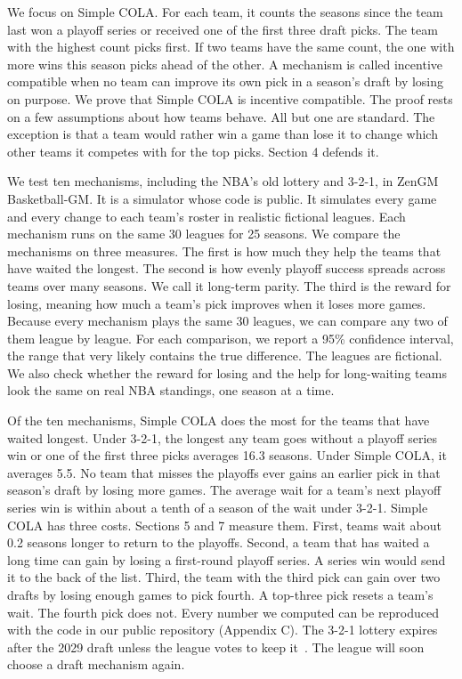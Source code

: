\documentclass[11pt,letterpaper]{article}
\begin{document}
We focus on Simple COLA. For each team, it counts the seasons since the team last won a playoff series or received one of the first three draft picks. The team with the highest count picks first. If two teams have the same count, the one with more wins this season picks ahead of the other. A mechanism is called incentive compatible when no team can improve its own pick in a season's draft by losing on purpose. We prove that Simple COLA is incentive compatible. The proof rests on a few assumptions about how teams behave. All but one are standard. The exception is that a team would rather win a game than lose it to change which other teams it competes with for the top picks. Section 4 defends it.

We test ten mechanisms, including the NBA's old lottery and 3-2-1, in ZenGM Basketball-GM. It is a simulator whose code is public. It simulates every game and every change to each team's roster in realistic fictional leagues. Each mechanism runs on the same 30 leagues for 25 seasons. We compare the mechanisms on three measures. The first is how much they help the teams that have waited the longest. The second is how evenly playoff success spreads across teams over many seasons. We call it long-term parity. The third is the reward for losing, meaning how much a team's pick improves when it loses more games. Because every mechanism plays the same 30 leagues, we can compare any two of them league by league. For each comparison, we report a 95\% confidence interval, the range that very likely contains the true difference. The leagues are fictional. We also check whether the reward for losing and the help for long-waiting teams look the same on real NBA standings, one season at a time.

Of the ten mechanisms, Simple COLA does the most for the teams that have waited longest. Under 3-2-1, the longest any team goes without a playoff series win or one of the first three picks averages 16.3 seasons. Under Simple COLA, it averages 5.5. No team that misses the playoffs ever gains an earlier pick in that season's draft by losing more games. The average wait for a team's next playoff series win is within about a tenth of a season of the wait under 3-2-1. Simple COLA has three costs. Sections 5 and 7 measure them. First, teams wait about 0.2 seasons longer to return to the playoffs. Second, a team that has waited a long time can gain by losing a first-round playoff series. A series win would send it to the back of the list. Third, the team with the third pick can gain over two drafts by losing enough games to pick fourth. A top-three pick resets a team's wait. The fourth pick does not. Every number we computed can be reproduced with the code in our public repository (Appendix C). The 3-2-1 lottery expires after the 2029 draft unless the league votes to keep it~\cite{oconnor2026lottery}. The league will soon choose a draft mechanism again.
\end{document}
